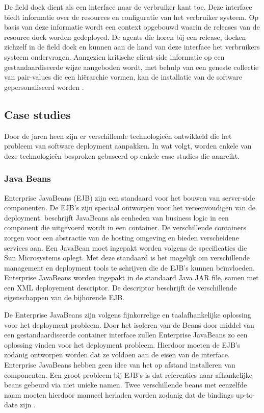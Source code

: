 De field dock dient als een interface naar de verbruiker kant toe.
Deze interface biedt informatie over de resources en configuratie van het verbruiker systeem.
Op basis van deze informatie wordt een context opgebouwd waarin de releases van de resource dock worden gedeployed.
De agents die horen bij een release, docken zichzelf in de field dock en kunnen aan de hand van deze interface het verbruikers systeem ondervragen.
Aangezien kritische client-side informatie op een gestandaardiseerde wijze aangeboden wordt, met behulp van een geneste collectie van pair-values die een hiërarchie vormen, kan de installatie van de software gepersonaliseerd worden \citep{hall1999cooperative}.

\subsection{Case studies}
Door de jaren heen zijn er verschillende technologieën ontwikkeld die het probleem van software deployment aanpakken.
In wat volgt, worden enkele van deze technologieën besproken gebaseerd op enkele case studies die \citet{softwareDeployment} aanreikt.

\subsubsection{Java Beans}
Enterprise JavaBeans (EJB) zijn een standaard voor het bouwen van server-side componenten.
De EJB's zijn speciaal ontworpen voor het vereenvoudigen van de deployment.
\citet{softwareDeployment} beschrijft JavaBeans als eenheden van business logic in een component die uitgevoerd wordt in een container.
De verschillende containers zorgen voor een abstractie van de hosting omgeving en bieden verscheidene services aan.
Een JavaBean moet ingepakt worden volgens de specificaties die Sun Microsystems oplegt.
Met deze standaard is het mogelijk om verschillende management en deployment tools te schrijven die de EJB's kunnen beïnvloeden.
Enterprise JavaBeans worden ingepakt in de standaard Java JAR file, samen met een XML deployement descriptor.
De descriptor beschrijft de verschillende eigenschappen van de bijhorende EJB.

De Enterprise JavaBeans zijn volgens \citet{softwareDeployment} fijnkorrelige en taalafhankelijke oplossing voor het deployment probleem.
Door het isoleren van de Beans door middel van een gestandaardiseerde container interface zullen Enterprise JavaBeans zo een oplossing vinden voor het deployment probleem.
Hierdoor moeten de EJB's zodanig ontworpen worden dat ze voldoen aan de eisen van de interface.
Enterprise JavaBeans hebben geen idee van het op afstand installeren van componenten.
Een groot probleem bij EJB's is dat referenties naar afhankelijke beans gebeurd via niet unieke namen.
Twee verschillende beans met eenzelfde naam moeten hierdoor manueel herladen worden zodanig dat de bindings up-to-date zijn \citep{rutherford2002reconfiguration}.

